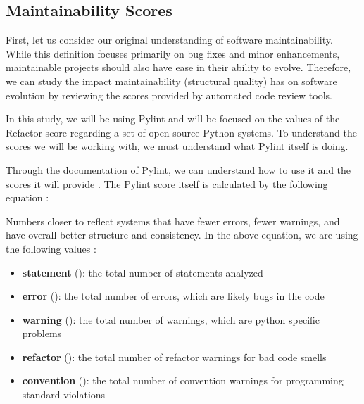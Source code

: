 \subsection{Maintainability Scores} \label{subMaintainabilityScores}



First, let us consider our original understanding of software maintainability. While this definition focuses primarily on bug fixes and minor enhancements, maintainable projects should also have ease in their ability to evolve. Therefore, we can study the impact maintainability (structural quality) has on software evolution by reviewing the scores provided by automated code review tools.

In this study, we will be using Pylint and will be focused on the values of the Refactor score regarding a set of open-source Python systems. To understand the scores we will be working with, we must understand what Pylint itself is doing. 

Through the documentation of Pylint, we can understand how to use it and the scores it will provide \cite{pylint:main}. The Pylint score itself is calculated by the following equation \cite{pylint:score}:

\vspace{0.25cm}
\begin{center}
\end{center}
\vspace{0.25cm}

Numbers closer to  reflect systems that have fewer errors, fewer warnings, and have overall better structure and consistency. In the above equation, we are using the following values \cite{pylint:docs}:

\vspace{0.25cm}
\begin{itemize}
    \item \textbf{statement} (): the total number of statements analyzed
    \item \textbf{error} (): the total number of errors, which are likely bugs in the code
    \item \textbf{warning} (): the total number of warnings, which are python specific problems
    \item \textbf{refactor} (): the total number of refactor warnings for bad code smells
    \item \textbf{convention} (): the total number of convention warnings for programming standard violations
\end{itemize}
\vspace{0.25cm}

